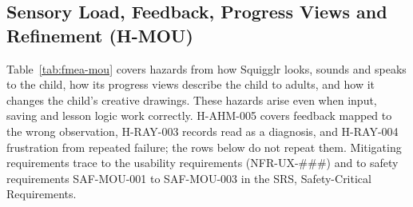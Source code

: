 \documentclass{article}
\begin{document}
\subsection{Sensory Load, Feedback, Progress Views and Refinement (H-MOU)}
\label{sec:fmea-mou}
Table~\ref{tab:fmea-mou} covers hazards from how Squigglr looks, sounds and
speaks to the child, how its progress views describe the child to adults, and
how it changes the child's creative drawings. These hazards arise even when
input, saving and lesson logic work correctly. H-AHM-005 covers feedback mapped
to the wrong observation, H-RAY-003 records read as a diagnosis, and H-RAY-004
frustration from repeated failure; the rows below do not repeat them. Mitigating
requirements trace to the usability requirements (NFR-UX-\#\#\#) and to safety
requirements SAF-MOU-001 to SAF-MOU-003 in the SRS, Safety-Critical
Requirements.
\end{document}
